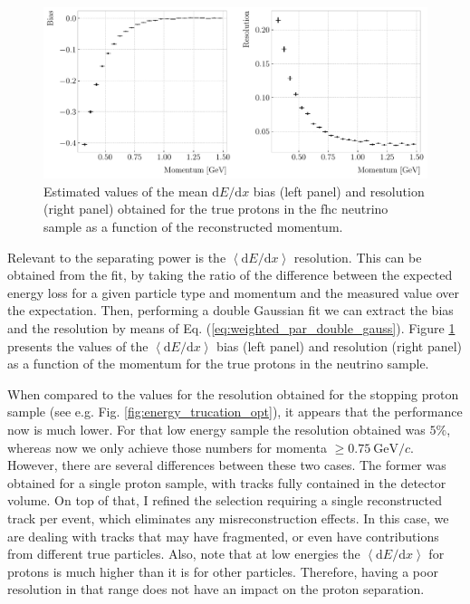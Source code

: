 \begin{figure}[t]
	\centering
	\includegraphics[width=.90\linewidth]{Images/GArSoft_PID/dEdx/proton_dEdx_momentum.pdf}
	\caption[Estimated values of the mean $\mathrm{d}E/\mathrm{d}x$ bias and resolution obtained for the true protons in a \gls{fhc} neutrino sample as a function of the momentum.]{Estimated values of the mean $\mathrm{d}E/\mathrm{d}x$ bias (left panel) and resolution (right panel) obtained for the true protons in the \gls{fhc} neutrino sample as a function of the reconstructed momentum.}
	\label{fig:proton_dEdx_momentum}
\end{figure}

Relevant to the separating power is the $\left<\mathrm{d}E/\mathrm{d}x\right>$ resolution. This can be obtained from the fit, by taking the ratio of the difference between the expected energy loss for a given particle type and momentum and the measured value over the expectation. Then, performing a double Gaussian fit we can extract the bias and the resolution by means of Eq. (\ref{eq:weighted_par_double_gauss}). Figure \ref{fig:proton_dEdx_momentum} presents the values of the $\left<\mathrm{d}E/\mathrm{d}x\right>$ bias (left panel) and resolution (right panel) as a function of the momentum for the true protons in the neutrino sample.

When compared to the values for the resolution obtained for the stopping proton sample (see e.g. Fig. \ref{fig:energy_trucation_opt}), it appears that the performance now is much lower. For that low energy sample the resolution obtained was $5\%$, whereas now we only achieve those numbers for momenta $\geq 0.75~\mathrm{GeV}/c$. However, there are several differences between these two cases. The former was obtained for a single proton sample, with tracks fully contained in the detector volume. On top of that, I refined the selection requiring a single reconstructed track per event, which eliminates any misreconstruction effects. In this case, we are dealing with tracks that may have fragmented, or even have contributions from different true particles. Also, note that at low energies the $\left<\mathrm{d}E/\mathrm{d}x\right>$ for protons is much higher than it is for other particles. Therefore, having a poor resolution in that range does not have an impact on the proton separation.

